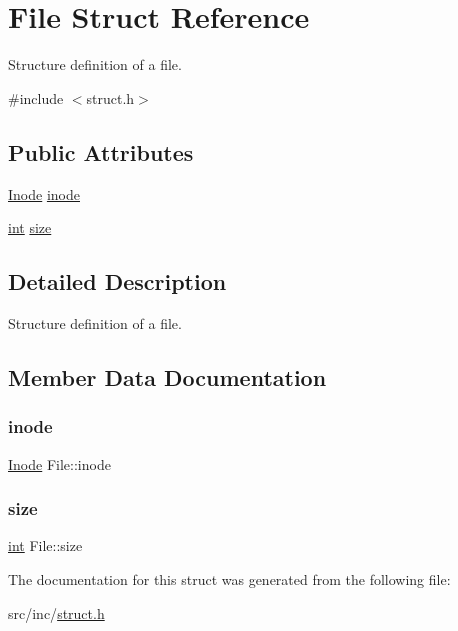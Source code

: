 \hypertarget{struct_file}{}\section{File Struct Reference}
\label{struct_file}


Structure definition of a file.  




{\ttfamily \#include $<$struct.\+h$>$}

\subsection*{Public Attributes}
\begin{DoxyCompactItemize}
\item 
\mbox{\hyperlink{struct_8h_a98d620fb2fb559434fab4f1283139169}{Inode}} \mbox{\hyperlink{struct_file_ad0b8ce6ba9021bc3af921484257dc56d}{inode}}
\item 
\mbox{\hyperlink{structint}{int}} \mbox{\hyperlink{struct_file_abec73ae2a96ee8136ba14a49fec88b25}{size}}
\end{DoxyCompactItemize}


\subsection{Detailed Description}
Structure definition of a file. 

\subsection{Member Data Documentation}
\mbox{\label{struct_file_ad0b8ce6ba9021bc3af921484257dc56d}} 
\subsubsection{\texorpdfstring{inode}{inode}}
{\footnotesize\ttfamily \mbox{\hyperlink{struct_8h_a98d620fb2fb559434fab4f1283139169}{Inode}} File\+::inode}

\mbox{\label{struct_file_abec73ae2a96ee8136ba14a49fec88b25}} 
\subsubsection{\texorpdfstring{size}{size}}
{\footnotesize\ttfamily \mbox{\hyperlink{structint}{int}} File\+::size}



The documentation for this struct was generated from the following file\+:\begin{DoxyCompactItemize}
\item 
src/inc/\mbox{\hyperlink{struct_8h}{struct.\+h}}\end{DoxyCompactItemize}
